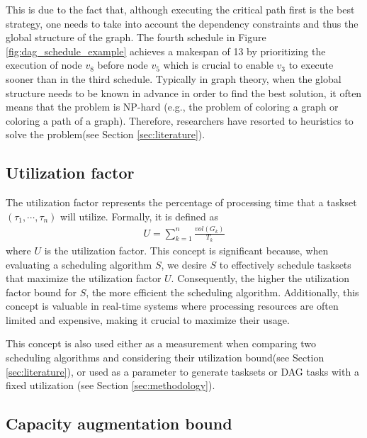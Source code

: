 This is due to the fact that, although executing the critical path first
is the best strategy\cite{zhao2020DAGsched}, 
one needs to take into account the dependency constraints
and thus the global structure of the graph.
The fourth schedule in Figure \ref{fig:dag_schedule_example}
achieves a makespan of 13 by prioritizing the execution of node $v_8$
before node $v_5$ which is crucial to enable $v_3$ to execute sooner
than in the third schedule.
Typically in graph theory, when the global structure needs to be known 
in advance
in order to find the best solution, it often means that the problem is NP-hard
(e.g., the problem of coloring a graph\cite{book1975richardNPhardColorGraph}
or coloring a path of a graph\cite{ERLEBACH2001ColorPathNPhard}).
Therefore, researchers have resorted to heuristics to solve the problem(see Section \ref{sec:literature}).


\subsection{Utilization factor}

The utilization factor represents the percentage of processing 
time that a taskset $(\tau_1, \cdots, \tau_n)$ will utilize. 
Formally, it is defined as
\begin{align}
U = \sum_{k=1}^{n} \frac{vol(G_k)}{T_k}
\end{align}
where $U$ is the utilization factor. This concept is significant 
because, when evaluating a scheduling algorithm $S$, we desire 
$S$ to effectively schedule tasksets that maximize the utilization 
factor $U$. Consequently, the higher the utilization factor bound 
for $S$, the more efficient the scheduling algorithm. Additionally, 
this concept is valuable in real-time systems where processing 
resources are often limited and expensive, making it crucial to 
maximize their usage.

This concept is also used either as a measurement
when comparing two scheduling algorithms 
and considering their utilization bound(see Section \ref{sec:literature}),
or used as a parameter to generate tasksets or DAG tasks with 
a fixed utilization (see Section \ref{sec:methodology}).

\subsection{Capacity augmentation bound}


